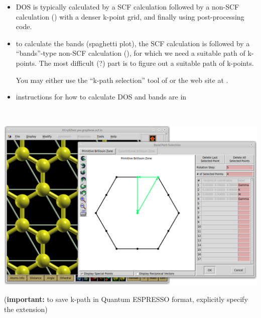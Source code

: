\documentclass[landscape]{foils}
\begin{document}


\begin{itemize}
\item DOS is typically calculated by a  SCF calculation
  followed by a  non-SCF calculation () with a denser k-point grid, and finally using
   post-processing code.

\item to calculate the bands (spaghetti plot), the  SCF
  calculation is followed by a  ``bands''-type non-SCF
  calculation (), for which we need a
  suitable path of k-points. The most difficult (?) part is to figure
  out a suitable path of k-points.

  You may either use the ``k-path selection'' tool of 
  or the  web site at
  .

\item instructions for how to calculate DOS and bands are in 
\end{itemize}

~\\[-1.5em]
\centerline{\includegraphics[width=25cm]{figs/xc-k-path.png}}
{\small ({\bf important:} to save k-path in Quantum ESPRESSO format, explicitly
specify the  extension)}
\end{document}

